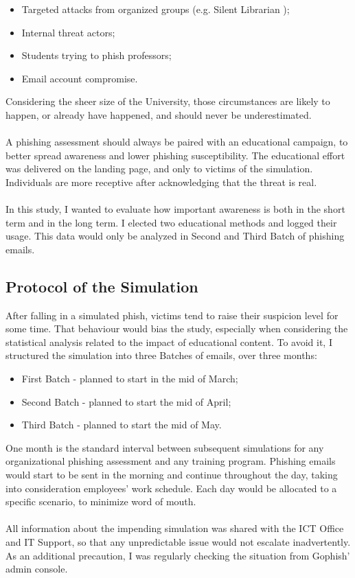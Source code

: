 \documentclass[a4paper]{article}
\begin{document}
\begin{itemize}
    \item Targeted attacks from organized groups (e.g. Silent Librarian \cite{article-silent-librarian});
    \item Internal threat actors;
    \item Students trying to phish professors;
    \item Email account compromise.
\end{itemize}

Considering the sheer size of the University, those circumstances are likely to happen, or already have happened, and should never be underestimated.
\\ \\
A phishing assessment should always be paired with an educational campaign, to better spread awareness and lower phishing susceptibility. The educational effort was delivered on the landing page, and only to victims of the simulation. Individuals are more receptive after acknowledging that the threat is real. 
\\ \\
In this study, I wanted to evaluate how important awareness is both in the short term and in the long term. I elected two educational methods and logged their usage. This data would only be analyzed in Second and Third Batch of phishing emails.

\subsection{Protocol of the Simulation}

After falling in a simulated phish, victims tend to raise their suspicion level for some time. That behaviour would bias the study, especially when considering the statistical analysis related to the impact of educational content. To avoid it, I structured the simulation into three Batches of emails, over three months:

\begin{itemize}
    \item First Batch - planned to start in the mid of March;
    \item Second Batch - planned to start the mid of April;
    \item Third Batch - planned to start the mid of May.
\end{itemize}

One month is the standard interval between subsequent simulations for any organizational phishing assessment and any training program. Phishing emails would start to be sent in the morning and continue throughout the day, taking into consideration employees' work schedule. Each day would be allocated to a specific scenario, to minimize word of mouth.
\\ \\
All information about the impending simulation was shared with the ICT Office and IT Support, so that any unpredictable issue would not escalate inadvertently. As an additional precaution, I was regularly checking the situation from Gophish' admin console.
\end{document}
